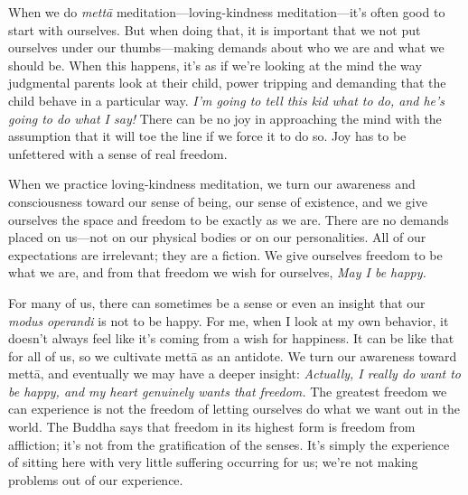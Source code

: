 
When we do \emph{mettā} meditation---loving-kindness meditation---it's 
often good to start with ourselves. But when doing that, it is 
important that we not put ourselves under our thumbs---making demands 
about who we are and what we should be. When this happens, it's as if 
we're looking at the mind the way judgmental parents look at their 
child, power tripping and demanding that the child behave in a 
particular way. \emph{I'm going to tell this kid what to do, and he's 
going to do what I say!} There can be no joy in approaching the mind 
with the assumption that it will toe the line if we force it to do so. 
Joy has to be unfettered with a sense of real freedom.

When we practice loving-kindness meditation, we turn our awareness and 
consciousness toward our sense of being, our sense of existence, and we 
give ourselves the space and freedom to be exactly as we are. There are 
no demands placed on us---not on our physical bodies or on our 
personalities. All of our expectations are irrelevant; they are a 
fiction. We give ourselves freedom to be what we are, and from that 
freedom we wish for ourselves, \emph{May I be happy.}

For many of us, there can sometimes be a sense or even an insight that 
our \emph{modus} \emph{operandi} is not to be happy. For me, when I 
look at my own behavior, it doesn't always feel like it's coming from a 
wish for happiness. It can be like that for all of us, so we cultivate 
mettā as an antidote. We turn our awareness toward mettā, and 
eventually we may have a deeper insight: \emph{Actually, I really do 
want to be happy, and my heart genuinely wants that freedom.} The 
greatest freedom we can experience is not the freedom of letting 
ourselves do what we want out in the world. The Buddha says that 
freedom in its highest form is freedom from affliction; it's not from 
the gratification of the senses. It's simply the experience of sitting 
here with very little suffering occurring for us; we're not making 
problems out of our experience.

